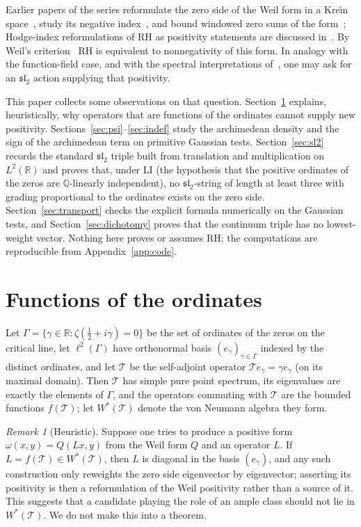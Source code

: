 \documentclass[11pt]{amsart}
\theoremstyle{definition}
\theoremstyle{remark}
\newtheorem{remark}[theorem]{Remark}
\newcommand{\RH}{\mathrm{RH}}
\newcommand{\T}{\mathcal T}
\newcommand{\sltwo}{\mathfrak{sl}_2}
\begin{document}
Earlier papers of the series reformulate the zero side of the Weil form in a
Kre\u\i n space~\cite{RP8}, study its negative index~\cite{RP11}, and bound windowed zero sums of the
form~\cite{RP16}; Hodge-index reformulations of $\RH$ as positivity statements
are discussed in~\cite{RP14}. By Weil's criterion~\cite{Weil52} RH is equivalent
to nonnegativity of this form. In analogy with the function-field case, and with
the spectral interpretations of~\cite{bgConnes99,bgDeninger}, one may ask for an
$\sltwo$ action supplying that positivity.

This paper collects some observations on that question. Section~\ref{sec:filter}
explains, heuristically, why operators that are functions of the ordinates
cannot supply new positivity. Sections~\ref{sec:psi}--\ref{sec:indef} study the
archimedean density and the sign of the archimedean term on primitive Gaussian
tests. Section~\ref{sec:sl2} records the standard $\sltwo$ triple built from
translation and multiplication on $L^2(\mathbb R)$ and proves that, under LI (the
hypothesis that the positive ordinates of the zeros are $\mathbb Q$-linearly
independent), no $\sltwo$-string of length at least three with grading
proportional to the ordinates exists on the zero side.
Section~\ref{sec:transport} checks the explicit formula numerically on the
Gaussian tests, and Section~\ref{sec:dichotomy} proves that the continuum triple
has no lowest-weight vector. Nothing here proves or assumes $\RH$; the
computations are reproducible from Appendix~\ref{app:code}.

\section{Functions of the ordinates}\label{sec:filter}
Let $\Gamma=\{\gamma\in\mathbb R:\zeta(\tfrac12+i\gamma)=0\}$ be the set of
ordinates of the zeros on the critical line, let $\ell^2(\Gamma)$ have
orthonormal basis $(e_\gamma)_{\gamma\in\Gamma}$ indexed by the distinct
ordinates, and let $\T$ be the self-adjoint operator $\T e_\gamma=\gamma e_\gamma$
(on its maximal domain). Then $\T$ has simple pure point spectrum, its eigenvalues
are exactly the elements of $\Gamma$, and the operators commuting with $\T$ are
the bounded functions $f(\T)$; let $W^*(\T)$ denote the von Neumann algebra they
form.

\begin{remark}[Heuristic]\label{prop:filter}
Suppose one tries to produce a positive form $\omega(x,y)=Q(Lx,y)$ from the Weil
form $Q$ and an operator $L$. If $L=f(\T)\in W^*(\T)$, then $L$ is diagonal in
the basis $(e_\gamma)$, and any such construction only reweights the zero side
eigenvector by eigenvector; asserting its positivity is then a reformulation of
the Weil positivity rather than a source of it. This suggests that a candidate
playing the role of an ample class should not lie in $W^*(\T)$. We do not make
this into a theorem.
\end{remark}
\end{document}
